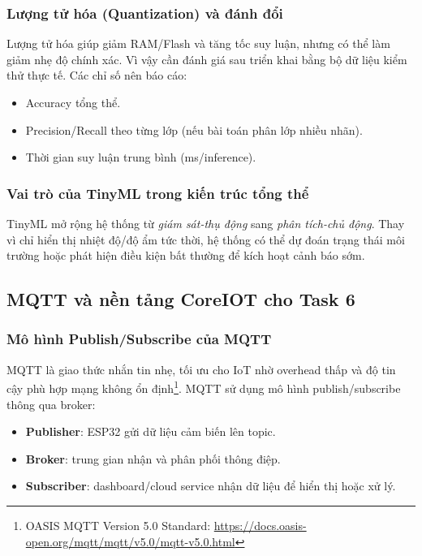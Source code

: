 \subsubsection*{Lượng tử hóa (Quantization) và đánh đổi}

Lượng tử hóa giúp giảm RAM/Flash và tăng tốc suy luận, nhưng có thể làm giảm nhẹ độ chính xác. Vì vậy cần đánh giá sau triển khai bằng bộ dữ liệu kiểm thử thực tế. Các chỉ số nên báo cáo:
\begin{itemize}
    \item Accuracy tổng thể.
    \item Precision/Recall theo từng lớp (nếu bài toán phân lớp nhiều nhãn).
    \item Thời gian suy luận trung bình (ms/inference).
\end{itemize}

\subsubsection*{Vai trò của TinyML trong kiến trúc tổng thể}

TinyML mở rộng hệ thống từ \textit{giám sát-thụ động} sang \textit{phân tích-chủ động}. Thay vì chỉ hiển thị nhiệt độ/độ ẩm tức thời, hệ thống có thể dự đoán trạng thái môi trường hoặc phát hiện điều kiện bất thường để kích hoạt cảnh báo sớm.

\subsection{MQTT và nền tảng CoreIOT cho Task 6}

\subsubsection*{Mô hình Publish/Subscribe của MQTT}

MQTT là giao thức nhắn tin nhẹ, tối ưu cho IoT nhờ overhead thấp và độ tin cậy phù hợp mạng không ổn định\footnote{OASIS MQTT Version 5.0 Standard: \url{https://docs.oasis-open.org/mqtt/mqtt/v5.0/mqtt-v5.0.html}}. MQTT sử dụng mô hình publish/subscribe thông qua broker:
\begin{itemize}
    \item \textbf{Publisher}: ESP32 gửi dữ liệu cảm biến lên topic.
    \item \textbf{Broker}: trung gian nhận và phân phối thông điệp.
    \item \textbf{Subscriber}: dashboard/cloud service nhận dữ liệu để hiển thị hoặc xử lý.
\end{itemize}

